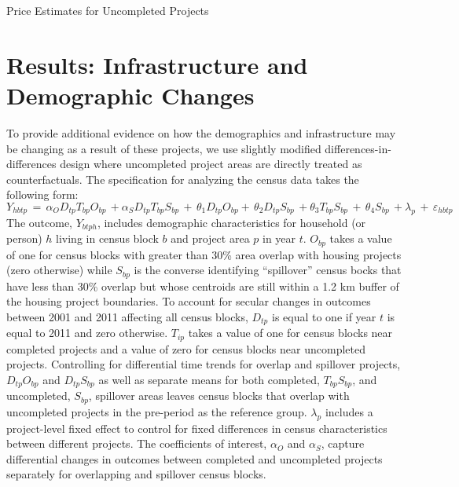 \documentclass[12pt]{article}
\begin{document}
\begin{table}
\caption{Price Estimates for Uncompleted Projects}\label{table:priceestplacebo}
\centering

\end{table}


\section{Results: Infrastructure and Demographic Changes}\label{section:resultscensus}

To provide additional evidence on how the demographics and infrastructure may be changing as a result of these projects, we use slightly modified differences-in-differences design where uncompleted project areas are directly treated as counterfactuals.  The specification for analyzing the census data takes the following form:
\begin{equation*}
Y_{hbtp} \, = \, \alpha_{O} D_{tp} T_{bp} O_{bp} \, + \alpha_{S} D_{tp} T_{bp} S_{bp} \, + \,\theta_1 D_{tp} O_{bp} + \,\theta_2 D_{tp} S_{bp} \, + \theta_3 T_{bp} S_{bp}  \, +  \, \theta_4 S_{bp} \, +  \lambda_p \, + \, \varepsilon_{hbtp}
\end{equation*}
The outcome, $Y_{btph}$, includes demographic characteristics for household (or person) $h$ living in census block $b$ and project area $p$ in year $t$.  $O_{bp}$ takes a value of one for census blocks with greater than 30\% area overlap with housing projects (zero otherwise) while $S_{bp}$ is the converse identifying ``spillover'' census bocks that have less than 30\% overlap but whose centroids are still within a 1.2 km buffer of the housing project boundaries.  To account for secular changes in outcomes between 2001 and 2011 affecting all census blocks, $D_{tp}$ is equal to one if year $t$ is equal to 2011 and zero otherwise.  $T_{ip}$ takes a value of one for census blocks near completed projects and a value of zero for census blocks near uncompleted projects.  Controlling for differential time trends for overlap and spillover projects, $D_{tp} O_{bp} $ and $D_{tp} S_{bp}$ as well as separate means for both completed, $T_{bp} S_{bp}$, and uncompleted, $S_{bp}$, spillover areas leaves census blocks that overlap with uncompleted projects in the pre-period as the reference group.  $\lambda_p$ includes a project-level fixed effect to control for fixed differences in census characteristics between different projects.  The coefficients of interest, $\alpha_O$ and $\alpha_{S}$, capture differential changes in outcomes between completed and uncompleted projects separately for overlapping and spillover census blocks.  
\end{document}
